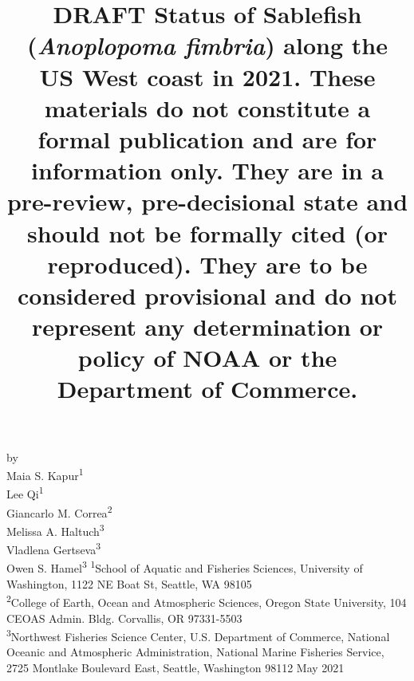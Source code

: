 \documentclass[11pt,
  english,
  a4paper,
]{article}
\date{}
\newcommand{\trTitle}{DRAFT Status of Sablefish (\emph{Anoplopoma fimbria}) along the US West coast in 2021. \newline \newline \newline These materials do not constitute a formal publication and are for information only. They are in a pre-review, pre-decisional state and should not be formally cited (or reproduced). They are to be considered provisional and do not represent any determination or policy of NOAA or the Department of Commerce.}
\newcommand{\trYear}{2021}
\newcommand{\trMonth}{May}
\begin{document}

\renewcommand*{\thefootnote}{\fnsymbol{footnote}}

\small
\thispagestyle{empty}
\noindent
\begin{center}
\title{DRAFT Status of Sablefish (\emph{Anoplopoma fimbria}) along the US West coast in 2021. \newline \newline \newline These materials do not constitute a formal publication and are for information only. They are in a pre-review, pre-decisional state and should not be formally cited (or reproduced). They are to be considered provisional and do not represent any determination or policy of NOAA or the Department of Commerce.}
\vspace{1.5cm}
{\Large\textbf{}}
\vfill
by\\
Maia S. Kapur\textsuperscript{1}\\
Lee Qi\textsuperscript{1}\\
Giancarlo M. Correa\textsuperscript{2}\\
Melissa A. Haltuch\textsuperscript{3}\\
Vladlena Gertseva\textsuperscript{3}\\
Owen S. Hamel\textsuperscript{3}\vfill
\textsuperscript{1}School of Aquatic and Fisheries Sciences, University of Washington, 1122 NE Boat St, Seattle, WA 98105\\
\textsuperscript{2}College of Earth, Ocean and Atmospheric Sciences, Oregon State University, 104 CEOAS Admin. Bldg. Corvallis, OR 97331-5503\\
\textsuperscript{3}Northwest Fisheries Science Center, U.S. Department of Commerce, National Oceanic and Atmospheric Administration, National Marine Fisheries Service, 2725 Montlake Boulevard East, Seattle, Washington 98112\vfill
\trMonth{} \trYear{}
\end{center}
\clearpage
\end{document}
